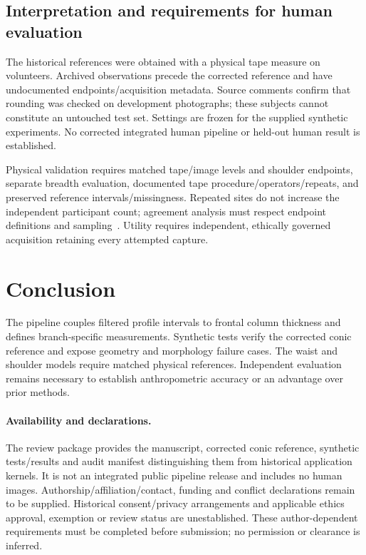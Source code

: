 \documentclass[11pt,a4paper]{article}
\begin{document}
\subsection{Interpretation and requirements for human evaluation}
The historical references were obtained with a physical tape measure on volunteers. Archived observations precede the corrected reference and have undocumented endpoints/acquisition metadata. Source comments confirm that rounding was checked on development photographs; these subjects cannot constitute an untouched test set. Settings are frozen for the supplied synthetic experiments. No corrected integrated human pipeline or held-out human result is established.

Physical validation requires matched tape/image levels and shoulder endpoints, separate breadth evaluation, documented tape procedure/operators/repeats, and preserved reference intervals/missingness. Repeated sites do not increase the independent participant count; agreement analysis must respect endpoint definitions and sampling~\cite{bland1986}. Utility requires independent, ethically governed acquisition retaining every attempted capture.

\section{Conclusion}
The pipeline couples filtered profile intervals to frontal column thickness and defines branch-specific measurements. Synthetic tests verify the corrected conic reference and expose geometry and morphology failure cases. The waist and shoulder models require matched physical references. Independent evaluation remains necessary to establish anthropometric accuracy or an advantage over prior methods.

\paragraph{Availability and declarations.}
The review package provides the manuscript, corrected conic reference, synthetic tests/results and audit manifest distinguishing them from historical application kernels. It is not an integrated public pipeline release and includes no human images. Authorship/affiliation/contact, funding and conflict declarations remain to be supplied. Historical consent/privacy arrangements and applicable ethics approval, exemption or review status are unestablished. These author-dependent requirements must be completed before submission; no permission or clearance is inferred.
\end{document}
